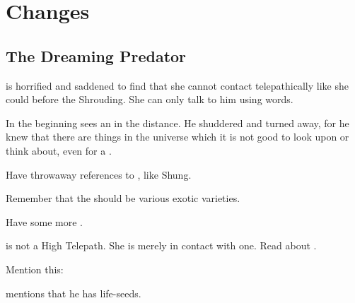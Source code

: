 \section{Changes}










\subsection{The Dreaming Predator}
\begin{changes}
  \begin{comment}\paragraph{Prologue}\end{comment}
    \Nzessuacrith is horrified and saddened to find that she cannot contact \Secherdamon telepathically like she could before the Shrouding. 
    She can only talk to him using words.
  
  \begin{comment}\paragraph{Wanderer in Darkness}\end{comment}
    
    In the beginning \Teshrial sees an \umbra in the distance.
    He shuddered and turned away, for he knew that there are things in the universe which it is not good to look upon or think about, even for a \resphan.
    
    Have throwaway references to , like Shung. 
  
    Remember that the \humans should be various exotic \demihuman varieties.
    
    Have some more . 
    
    \Achsah is not a High Telepath.
    She is merely in contact with one.
    Read about .
    
    Mention this:
    
    \Teshrial mentions that he has life-seeds.
    

\end{changes}

